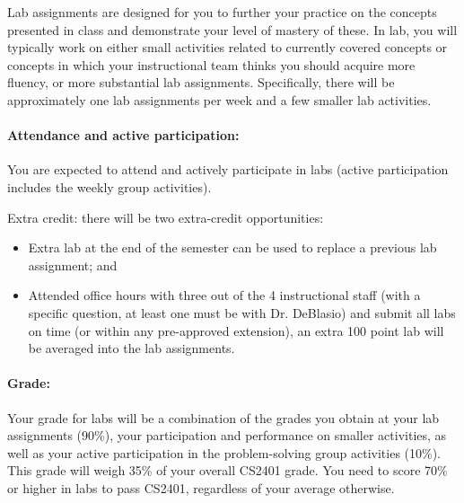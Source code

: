 \documentclass[12pt]{scrartcl}
\begin{document}
Lab assignments are designed for you to further your practice on the concepts presented in class and demonstrate your level of mastery of these. 
In lab, you will typically work on either small activities related to currently covered concepts or concepts in which your instructional team thinks you should acquire more fluency, or more substantial lab assignments. 
Specifically, there will be approximately one lab assignments per week and a few smaller lab activities. 


\paragraph{Attendance and active participation:} You are expected to attend and actively participate in labs (active participation includes the weekly group activities). 

Extra credit: there will be two extra-credit opportunities: 
\begin{itemize}
\item Extra lab at the end of the semester can be used to replace a previous lab assignment; and 
\item Attended office hours with three out of the 4 instructional staff (with a specific question, at least one must be with Dr. DeBlasio) and submit all labs on time (or within any pre-approved extension), an extra 100 point lab will be averaged into the lab assignments.
\end{itemize}

\paragraph{Grade:} Your grade for labs will be a combination of the grades you obtain at your lab assignments (90\%), your participation and performance on smaller activities, as well as your active participation in the problem-solving group activities (10\%). 
This grade will weigh 35\% of your overall CS2401 grade. 
You need to score 70\% or higher in labs to pass CS2401, regardless of your average otherwise.
\end{document}
